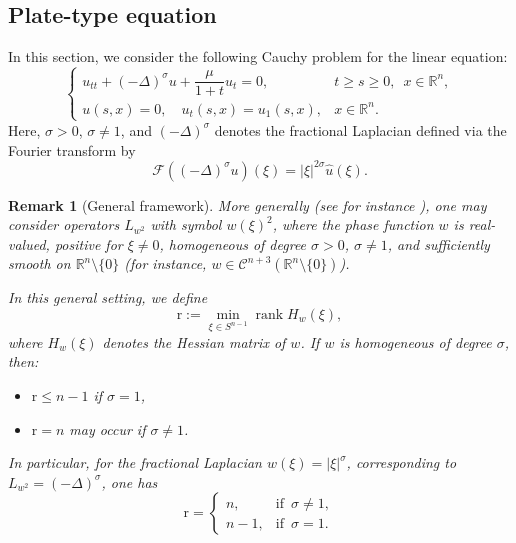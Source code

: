 \documentclass[10pt]{article}
\newtheorem{lemma}{Lemma}[section]
\newtheorem{remark}{Remark}[section]
\newcommand{\<}{\langle}
\renewcommand{\>}{\rangle}
\numberwithin{equation}{section}
\begin{document}
\subsection{Plate-type equation}\label{sec:linear-plate}
In this section, we consider the following Cauchy problem for the linear equation:
\begin{equation}\label{eq:Homogeneous}
\begin{cases}
u_{tt}+ (-\Delta)^\sigma u+ \dfrac{\mu}{1+t} u_t =0, & t\geq s\geq 0,\,\,\, x\in\mathbb{R}^n,\\
u(s,x)=0, \quad u_t(s,x)=u_1(s, x), & x\in\mathbb{R}^n.
\end{cases}
\end{equation}
Here, $\sigma>0$, $\sigma\neq1$, and $(-\Delta)^\sigma$ denotes the fractional Laplacian defined via the Fourier transform by
\[ \mathcal{F}\left((-\Delta)^\sigma u\right)(\xi) = |\xi|^{2\sigma}\hat{u}(\xi). \]
\begin{remark}[General framework]
More generally (see for instance \cite{DEL=2026}), one may consider operators $L_{w^2}$ with symbol $w(\xi)^2$, where the phase function $w$ is real-valued, positive for $\xi\neq0$, homogeneous of degree $\sigma>0$, $\sigma\neq1$, and sufficiently smooth on $\mathbb{R}^n\setminus\{0\}$ (for instance, $w\in\mathcal{C}^{n+3}(\mathbb{R}^n\setminus\{0\})$).

In this general setting, we define
\[ \mathrm{r}:=\min_{\xi\in S^{n-1}}\operatorname{rank} H_w(\xi), \]
where $H_w(\xi)$ denotes the Hessian matrix of $w$. If $w$ is homogeneous of degree $\sigma$, then:
\begin{itemize}
\item $\mathrm{r}\leq n-1$ if $\sigma=1$,
\item $\mathrm{r}=n$ may occur if $\sigma\neq1$.
\end{itemize}
In particular, for the fractional Laplacian $w(\xi)=|\xi|^\sigma$, corresponding to $L_{w^2}=(-\Delta)^\sigma$, one has
\[
\mathrm{r}=
\begin{cases}
n, & \text{if}\,\,\, \sigma\neq1,\\
n-1, & \text{if}\,\,\, \sigma=1.
\end{cases}
\]
\end{remark}
%
\end{document}
